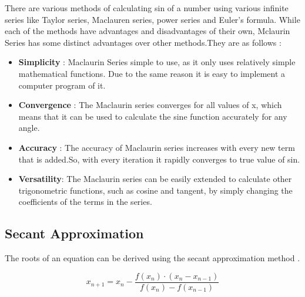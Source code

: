     \begin{flushleft}
    There are various methods of calculating sin of a number using various infinite series like Taylor series, Maclauren series, power series and Euler's formula.
    While each of the methods have advantages and disadvantages of their own, Mclaurin Series has some distinct advantages over other methods.They are as follows :
    \end{flushleft}
    \begin{itemize}
      \item \textbf{Simplicity} : Maclaurin Series simple to use, as it only uses relatively simple mathematical functions. Due to the same reason it is easy to implement a computer program of it.
      \item \textbf{Convergence} : The Maclaurin series converges for all values of x, which means that it can be used to calculate the sine function accurately for any angle.
      \item  \textbf{Accuracy} : The accuracy of Maclaurin series increases with every new term that is added.So, with every iteration it rapidly converges to true value of sin.
      \item \textbf{Versatility}: The Maclaurin series can be easily extended to calculate other trigonometric functions, such as cosine and tangent, by simply changing the coefficients of the terms in the series.
    \end{itemize}

  \subsection{Secant Approximation}
    \begin{flushleft}
    The roots of an equation can be derived using the secant approximation method \cite{Wikipedia:SecantMethod}.
    \end{flushleft}
    $$ x_{n+1} = x_n - \frac{f(x_n) \cdot (x_n - x_{n-1})}{f(x_n) - f(x_{n-1})} $$

